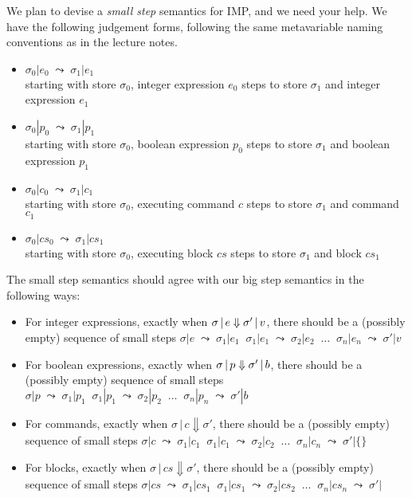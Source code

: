 \documentclass{article}
\begin{document}
\newcommand{\execJ}[3]{#1 \,|\, #2 \Downarrow #3}
\newcommand{\cs}{\mathit{cs}}
\newcommand{\cmp}{\mathit{cmp}}
\newcommand{\fbx}[1]{\framebox{\ensuremath{#1}}}



\newcommand{\ssj}[4]{#1|#2 \;\leadsto\; #3|#4}

 We plan to devise a \emph{small step} semantics for IMP, and we need
your help. We have the following judgement forms, following the same metavariable naming
conventions as in the lecture notes.

\begin{itemize}
\item $\ssj{\sigma_0}{e_0}{\sigma_1}{e_1}$\\
  starting with store $\sigma_0$, integer expression $e_0$ steps to store $\sigma_1$ and integer expression $e_1$
\item $\ssj{\sigma_0}{p_0}{\sigma_1}{p_1}$\\
  starting with store $\sigma_0$, boolean expression $p_0$ steps to
  store $\sigma_1$ and boolean expression $p_1$
\item $\ssj{\sigma_0}{c_0}{\sigma_1}{c_1}$\\
  starting with store $\sigma_0$, executing command $c$ steps to store
  $\sigma_1$ and command $c_1$
\item $\ssj{\sigma_0}{\cs_0}{\sigma_1}{\cs_1}$\\
  starting with store $\sigma_0$, executing block $\cs$ steps to store
  $\sigma_1$ and block $\cs_1$
\end{itemize}

The small step semantics should agree with our big step semantics in
the following ways:

\begin{itemize}
  \item For integer expressions, exactly when $\sigma \,|\, e \Downarrow \sigma' \,|\, v$, there should
    be a (possibly empty) sequence of small steps
    $\ssj{\sigma}{e}{\sigma_1}{e_1} \;\;
    \ssj{\sigma_1}{e_1}{\sigma_2}{e_2}\;\;\ldots\;\;
    \ssj{\sigma_n}{e_n}{\sigma'}{v}$
  \item For boolean expressions, exactly when $\sigma \,|\, p \Downarrow \sigma' \,|\, b$, there should
    be a (possibly empty) sequence of small steps
    $\ssj{\sigma}{p}{\sigma_1}{p_1} \;\;
    \ssj{\sigma_1}{p_1}{\sigma_2}{p_2}\;\;\ldots\;\;
    \ssj{\sigma_n}{p_n}{\sigma'}{b}$
  \item For commands, exactly when $\execJ{\sigma}{c}{\sigma'}$, there should
    be a (possibly empty) sequence of small steps
    $\ssj{\sigma}{c}{\sigma_1}{c_1} \;\;
    \ssj{\sigma_1}{c_1}{\sigma_2}{c_2}\;\;\ldots\;\;
    \ssj{\sigma_n}{c_n}{\sigma'}{\{\}}$
  \item For blocks, exactly when $\execJ{\sigma}{\cs}{\sigma'}$, there should
    be a (possibly empty) sequence of small steps
    $\ssj{\sigma}{\cs}{\sigma_1}{\cs_1} \;\;
    \ssj{\sigma_1}{\cs_1}{\sigma_2}{\cs_2}\;\;\ldots\;\;
    \ssj{\sigma_n}{\cs_n}{\sigma'}{}$
\end{itemize}
\end{document}
